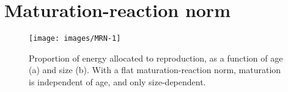 \documentclass[a4paper, toc=index,abstract=true]{scrartcl}\usepackage[]{graphicx}\usepackage[]{color}
\makeatletter
\def\maxwidth{ %
  \ifdim\Gin@nat@width>\linewidth
    \linewidth
  \else
    \Gin@nat@width
  \fi
}
\makeatother
\begin{document}


\section{Maturation-reaction norm}

\begin{figure}

{\centering \texttt{[image: images/MRN-1]} 

}

\caption[Proportion of energy allocated to reproduction, as a function of age (a) and size (b)]{Proportion of energy allocated to reproduction, as a function of age (a) and size (b). With a flat maturation-reaction norm, maturation is independent of age, and only size-dependent.}\label{fig:MRN}
\end{figure}
\end{document}
